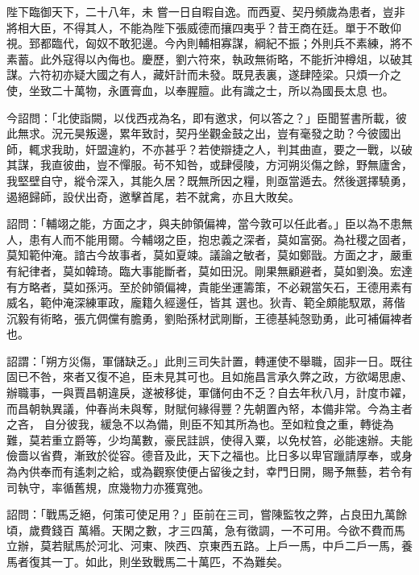 \begin{pinyinscope}
 陛下臨御天下，二十八年，未
 嘗一日自暇自逸。而西夏、契丹頻歲為患者，豈非將相大臣，不得其人，不能為陛下張威德而攘四夷乎？昔王商在廷。單于不敢仰視。郅都臨代，匈奴不敢犯邊。今內則輔相寡謀，綱紀不振；外則兵不素練，將不素蓄。此外寇得以內侮也。慶歷，劉六符來，執政無術略，不能折沖樽俎，以破其謀。六符初亦疑大國之有人，藏奸計而未發。既見表裏，遂肆陸梁。只煩一介之使，坐致二十萬物，永匱膏血，以奉腥膻。此有識之士，所以為國長太息
 也。



 今詔問：「北使詣闕，以伐西戎為名，即有邀求，何以答之？」臣聞誓書所載，彼此無求。況元昊叛邊，累年致討，契丹坐觀金鼓之出，豈有毫發之助？今彼國出師，輒求我助，奸盟違約，不亦甚乎？若使辯捷之人，判其曲直，要之一戰，以破其謀，我直彼曲，豈不憚服。茍不知咎，或肆侵陵，方河朔災傷之餘，野無廬舍，我堅壁自守，縱令深入，其能久居？既無所因之糧，則亟當遁去。然後選擇驍勇，遏絕歸師，設伏出奇，邀擊首尾，若不就禽，亦且大敗矣。



 詔問：「輔翊之能，方面之才，與夫帥領偏裨，當今敦可以任此者。」臣以為不患無人，患有人而不能用爾。今輔翊之臣，抱忠義之深者，莫如富弼。為社稷之固者，莫知範仲淹。諳古今故事者，莫如夏竦。議論之敏者，莫如鄭戩。方面之才，嚴重有紀律者，莫如韓琦。臨大事能斷者，莫如田況。剛果無顧避者，莫如劉渙。宏達有方略者，莫如孫沔。至於帥領偏裨，貴能坐運籌策，不必親當矢石，王德用素有威名，範仲淹深練軍政，龐籍久經邊任，皆其
 選也。狄青、範全頗能馭眾，蔣偕沉毅有術略，張亢倜儻有膽勇，劉貽孫材武剛斷，王德基純愨勁勇，此可補偏裨者也。



 詔謂：「朔方災傷，軍儲缺乏。」此則三司失計置，轉運使不舉職，固非一日。既往固已不咎，來者又復不追，臣未見其可也。且如施昌言承久弊之政，方欲竭思慮、辦職事，一與賈昌朝違戾，遂被移徙，軍儲何由不乏？自去年秋八月，計度市糴，而昌朝執異議，仲春尚未與奪，財賦何緣得豐？先朝置內帑，本備非常。今為主者之吝，
 自分彼我，緩急不以為備，則臣不知其所為也。至如粒食之重，轉徙為難，莫若重立爵等，少均萬數，豪民詿誤，使得入粟，以免杖笞，必能速辦。夫能儉嗇以省費，漸致於從容。德音及此，天下之福也。比日多以卑官躐請厚奉，或身為內供奉而有遙刺之給，或為觀察使便占留後之封，幸門日開，賜予無藝，若令有司執守，率循舊規，庶幾物力亦獲寬弛。



 詔問：「戰馬乏絕，何策可使足用？」臣前在三司，嘗陳監牧之弊，占良田九萬餘頃，歲費錢百
 萬緡。天閑之數，才三四萬，急有徵調，一不可用。今欲不費而馬立辦，莫若賦馬於河北、河東、陜西、京東西五路。上戶一馬，中戶二戶一馬，養馬者復其一丁。如此，則坐致戰馬二十萬匹，不為難矣。




\end{pinyinscope}
